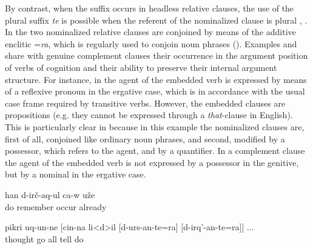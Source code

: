 By contrast, when the suffix occurs in headless relative clauses, the use of the plural suffix \textit{te} is possible when the referent of the nominalized clause is plural , . In  the two nominalized relative clauses are conjoined by means of the additive enclitic =\textit{ra}, which is regularly used to conjoin noun phrases (). Examples  and  share with genuine complement clauses their occurrence in the argument position of verbs of cognition and their ability to preserve their internal argument structure. For instance, in  the agent of the embedded verb is expressed by means of a reflexive pronoun in the ergative case, which is in accordance with the usual case frame required by transitive verbs. However, the embedded clauses are propositions (e.g. they cannot be expressed through a \textit{that}-clause in English). This is particularly clear in   because in this example the nominalized clauses are, first of all, conjoined like ordinary noun phrases, and second, modified by a possessor, which refers to the agent, and by a quantifier. In a complement clause the agent of the embedded verb is not expressed by a possessor in the genitive, but by a nominal in the ergative case. 


%
\begin{exe}
	\ex	\label{ex:He remembered what he had done attributive markers}
		han	d-irč-aq-ul	ca-w	uže\\
			do remember	occur		already\\
	\glt	{}

	\ex	\label{ex:‎‎and thought of what he had said and done}
	\gll	pikri	uq-un-ne	[cin-na	li<d>il	[d-urs-an-te=ra]	[d-irq'-an-te=ra]] ...\\
		thought	go		all	tell	do\\
	\glt	{}
\end{exe}

